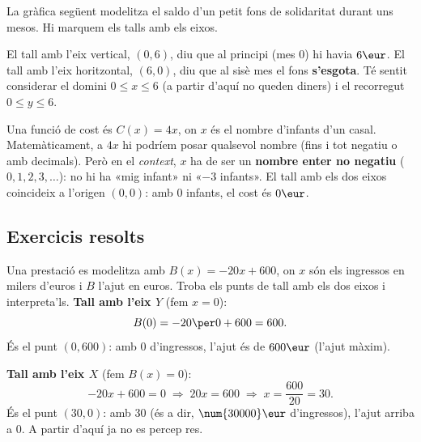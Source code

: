 \begin{exemple}
La gràfica següent modelitza el saldo d'un petit fons de solidaritat durant uns
mesos. Hi marquem els talls amb els eixos.

\begin{center}

\end{center}

\noindent El tall amb l'eix vertical, $(0,6)$, diu que al principi (mes $0$) hi
havia $6\eur$. El tall amb l'eix horitzontal, $(6,0)$, diu que al sisè mes el fons
\textbf{s'esgota}. Té sentit considerar el domini $0\le x\le 6$ (a partir d'aquí no
queden diners) i el recorregut $0\le y\le 6$.
\end{exemple}

\begin{exemple}
Una funció de cost és $C(x)=4x$, on $x$ és el nombre d'infants d'un casal.
Matemàticament, a $4x$ hi podríem posar qualsevol nombre (fins i tot negatiu o amb
decimals). Però en el \emph{context}, $x$ ha de ser un \textbf{nombre enter no
negatiu} ($0,1,2,3,\dots$): no hi ha «mig infant» ni «$-3$ infants». El tall amb els
dos eixos coincideix a l'origen $(0,0)$: amb $0$ infants, el cost és $0\eur$.
\end{exemple}

\subsection{Exercicis resolts}

\begin{exresolt}
Una prestació es modelitza amb $B(x)=-20x+600$, on $x$ són els ingressos en milers
d'euros i $B$ l'ajut en euros. Troba els punts de tall amb els dos eixos i
interpreta'ls.
\solucio
\textbf{Tall amb l'eix $Y$} (fem $x=0$):
\[
B(0)=-20\per 0+600=600.
\]
És el punt $(0,600)$: amb $0$ d'ingressos, l'ajut és de $600\eur$ (l'ajut màxim).

\textbf{Tall amb l'eix $X$} (fem $B(x)=0$):
\[
-20x+600=0 \;\Rightarrow\; 20x=600 \;\Rightarrow\; x=\frac{600}{20}=30.
\]
És el punt $(30,0)$: amb $30$ (és a dir, $\num{30000}\eur$ d'ingressos), l'ajut
arriba a $0$. A partir d'aquí ja no es percep res.
\end{exresolt}

